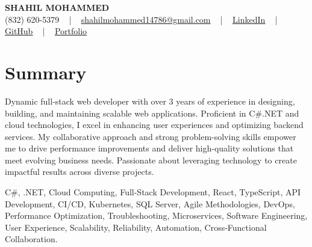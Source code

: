 \documentclass[letterpaper,10pt]{article}
\begin{document}
\begin{center}
    {\fontsize{14pt}{12pt}\selectfont \textbf{\MakeUppercase{Shahil Mohammed}}}\\ \vspace{2pt}
    \fontsize{10pt}{12pt}\selectfont (832) 620-5379 ~ | ~ \href{mailto:shahilmohammed14786@gmail.com}{shahilmohammed14786@gmail.com} ~ | ~  
    \href{https://www.linkedin.com/in/shahil-mohammed-9652931a1/}{\color{blue}\underline{LinkedIn}}  ~ | ~ 
    \href{https://github.com/freakbeast14}{\color{blue}\underline{GitHub}} ~ | ~ 
    \href{https://shahil-mohammed.netlify.app/}{\color{blue}\underline{Portfolio}}
    \vspace{-8pt}
\end{center}

\section{Summary}
\vspace{-2pt}\fontsize{8pt}{9pt}\selectfont
Dynamic full-stack web developer with over 3 years of experience in designing, building, and maintaining scalable web applications. Proficient in C#.NET and cloud technologies, I excel in enhancing user experiences and optimizing backend services. My collaborative approach and strong problem-solving skills empower me to drive performance improvements and deliver high-quality solutions that meet evolving business needs. Passionate about leveraging technology to create impactful results across diverse projects.
 \vspace{-5pt}
 
{\fontsize{1pt}{1pt}\selectfont\color{white}
C#, .NET, Cloud Computing, Full-Stack Development, React, TypeScript, API Development, CI/CD, Kubernetes, SQL Server, Agile Methodologies, DevOps, Performance Optimization, Troubleshooting, Microservices, Software Engineering, User Experience, Scalability, Reliability, Automation, Cross-Functional Collaboration.
}
\vspace{-8pt}

\vspace{-2pt}
\end{document}
